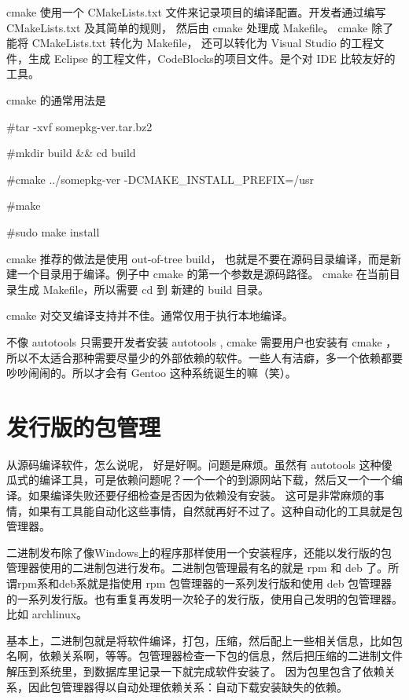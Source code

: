 cmake 使用一个 CMakeLists.txt 文件来记录项目的编译配置。开发者通过编写 CMakeLists.txt 及其简单的规则， 然后由 cmake 处理成 Makefile。 cmake 除了能将 CMakeLists.txt 转化为 Makefile， 还可以转化为 Visual Studio 的工程文件，生成 Eclipse 的工程文件，CodeBlocks的项目文件。是个对 IDE 比较友好的 工具。

cmake 的通常用法是 

\begin{code}
\#tar -xvf somepkg-ver.tar.bz2

\#mkdir build \&\& cd build

\#cmake ../somepkg-ver -DCMAKE\_INSTALL\_PREFIX=/usr

\#make

\#sudo make install
\end{code}

cmake 推荐的做法是使用 out-of-tree build， 也就是不要在源码目录编译，而是新建一个目录用于编译。例子中 cmake 的第一个参数是源码路径。
cmake 在当前目录生成 Makefile，所以需要 cd 到 新建的 build 目录。

cmake 对交叉编译支持并不佳。通常仅用于执行本地编译。

不像 autotools 只需要开发者安装 autotools , cmake 需要用户也安装有 cmake ， 所以不太适合那种需要尽量少的外部依赖的软件。一些人有洁癖，多一个依赖都要吵吵闹闹的。所以才会有 Gentoo 这种系统诞生的嘛（笑）。

\section{发行版的包管理}\label{section:pkgmgr}

从源码编译软件，怎么说呢， 好是好啊。问题是麻烦。虽然有 autotools 这种傻瓜式的编译工具，可是依赖问题呢？一个一个的到源网站下载，然后又一个一个编译。如果编译失败还要仔细检查是否因为依赖没有安装。
这可是非常麻烦的事情，如果有工具能自动化这些事情，自然就再好不过了。这种自动化的工具就是包管理器。

二进制发布除了像Windows上的程序那样使用一个安装程序，还能以发行版的包管理器使用的二进制包进行发布。二进制包管理最有名的就是 rpm 和 deb 了。所谓rpm系和deb系就是指使用 rpm 包管理器的一系列发行版和使用 deb 包管理器的一系列发行版。也有重复再发明一次轮子的发行版，使用自己发明的包管理器。比如 archlinux。

基本上，二进制包就是将软件编译，打包，压缩，然后配上一些相关信息，比如包名啊，依赖关系啊，等等。包管理器检查一下包的信息，然后把压缩的二进制文件解压到系统里，到数据库里记录一下就完成软件安装了。
因为包里包含了依赖关系，因此包管理器得以自动处理依赖关系：自动下载安装缺失的依赖。

